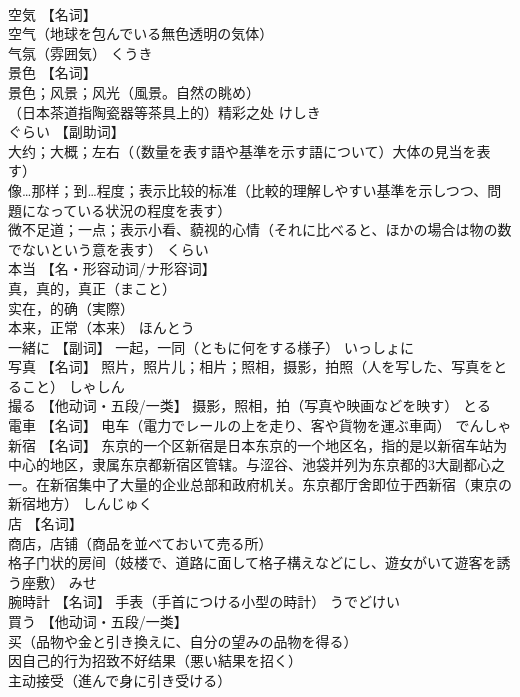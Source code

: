\documentclass[8pt]{extreport}
\begin{document}
\begin{CJK}{UTF8}{min}
\\	空気	【名词】 
\\	空气（地球を包んでいる無色透明の気体） 
\\	气氛（雰囲気）	くうき	
\\	景色	【名词】 
\\	景色；风景；风光（風景。自然の眺め） 
\\	（日本茶道指陶瓷器等茶具上的）精彩之处	けしき	
\\	ぐらい	【副助词】 
\\	大约；大概；左右（（数量を表す語や基準を示す語について）大体の見当を表す） 
\\	像…那样；到…程度；表示比较的标准（比較的理解しやすい基準を示しつつ、問題になっている状況の程度を表す） 
\\	微不足道；一点；表示小看、藐视的心情（それに比べると、ほかの場合は物の数でないという意を表す）	くらい	
\\	本当	【名・形容动词/ナ形容词】 
\\	真，真的，真正（まこと） 
\\	实在，的确（実際） 
\\	本来，正常（本来）	ほんとう	
\\	一緒に	【副词】 一起，一同（ともに何をする様子）	いっしょに	
\\	写真	【名词】 照片，照片儿；相片；照相，摄影，拍照（人を写した、写真をとること）	しゃしん	
\\	撮る	【他动词・五段/一类】 摄影，照相，拍（写真や映画などを映す）	とる	
\\	電車	【名词】 电车（電力でレールの上を走り、客や貨物を運ぶ車両）	でんしゃ	
\\	新宿	【名词】 东京的一个区新宿是日本东京的一个地区名，指的是以新宿车站为中心的地区，隶属东京都新宿区管辖。与涩谷、池袋并列为东京都的3大副都心之一。在新宿集中了大量的企业总部和政府机关。东京都厅舍即位于西新宿（東京の新宿地方）	しんじゅく	
\\	店	【名词】 
\\	商店，店铺（商品を並べておいて売る所） 
\\	格子门状的房间（妓楼で、道路に面して格子構えなどにし、遊女がいて遊客を誘う座敷）	みせ	
\\	腕時計	【名词】 手表（手首につける小型の時計）	うでどけい	
\\	買う	【他动词・五段/一类】 
\\	买（品物や金と引き換えに、自分の望みの品物を得る） 
\\	因自己的行为招致不好结果（悪い結果を招く） 
\\	主动接受（進んで身に引き受ける） 

\end{CJK}
\end{document}
